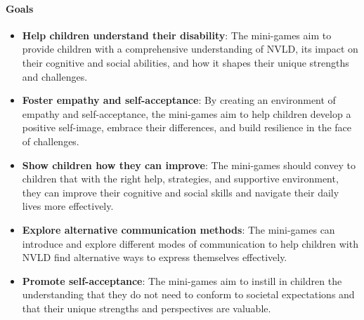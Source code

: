 \paragraph{Goals}
\begin{itemize}
    \item \textbf{Help children understand their disability}: The mini-games aim to provide children with a comprehensive understanding of NVLD, its impact on their cognitive and social abilities, and how it shapes their unique strengths and challenges.
    \item \textbf{Foster empathy and self-acceptance}: By creating an environment of empathy and self-acceptance, the mini-games aim to help children develop a positive self-image, embrace their differences, and build resilience in the face of challenges.
    \item \textbf{Show children how they can improve}: The mini-games should convey to children that with the right help, strategies, and supportive environment, they can improve their cognitive and social skills and navigate their daily lives more effectively.
    \item \textbf{Explore alternative communication methods}: The mini-games can introduce and explore different modes of communication to help children with NVLD find alternative ways to express themselves effectively.
    \item \textbf{Promote self-acceptance}: The mini-games aim to instill in children the understanding that they do not need to conform to societal expectations and that their unique strengths and perspectives are valuable.
\end{itemize}

